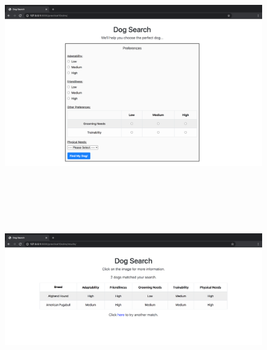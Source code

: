 \documentclass{article}
\begin{document}
\begin{figure}[H]
  \includegraphics[width=175mm, height=100mm]{./img/10-expected-dog-search-1.png}
  \includegraphics[width=175mm, height=75mm]{./img/10-expected-dog-search-2.png}   
\end{figure}
\end{document}
